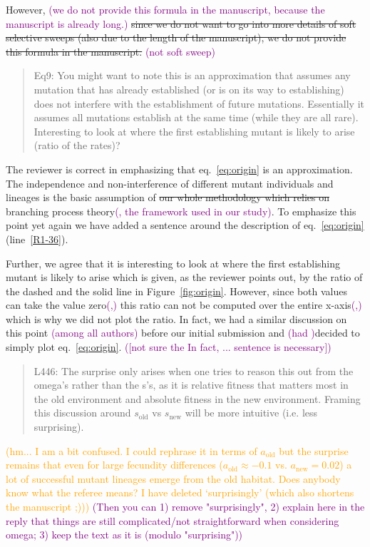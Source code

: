\documentclass[11pt]{article}
\newenvironment{referee}{\vspace{0.cm} \sffamily \color{colreferee} \begin{quotation} }{\end{quotation} \vspace{0.cm}}
\newcommand{\lmarginpar}[1]{\reversemarginpar\marginpar{\textcolor{colreferee}{\textbf{\textsf{[#1]}}}}}
\newcommand{\addnb}[1]{\refstepcounter{numcom}\lmarginpar{\arabic{numcom}}\label{#1}}
\newcommand{\florence}[1]{\textcolor{purple}{(#1)}}
\newcommand{\pete}[1]{\textcolor{orange}{(#1)}}
\newcounter{numcom}
\begin{document}
However, \florence{we do not provide this formula in the manuscript, because the manuscript is already long.}\st{ since we do not want to go into more details of soft selective sweeps (also due to the length of the manuscript), we do not provide this formula in the manuscript.} \florence{not soft sweep}

\begin{referee}
Eq9:\addnb{R1_36} You might want to note this is an approximation that assumes any mutation that has already established (or is on its way to establishing) does not interfere with the establishment of future mutations. Essentially it assumes all mutations establish at the same time (while they are all rare). Interesting to look at where the first establishing mutant is likely to arise (ratio of the rates)?
\end{referee}

The reviewer is correct in emphasizing that eq.~\eqref{eq:origin} is an approximation. The independence and non-interference of different mutant individuals and lineages is the basic assumption of \st{our whole methodology which relies on }branching process theory\florence{, the framework used in our study}. To emphasize this point yet again we have added a sentence around the description of eq.~\eqref{eq:origin} (line~\ref{R1-36}). 

Further, we agree that it is interesting to look at where the first establishing mutant is likely to arise which is given, as the reviewer points out, by the ratio of the dashed and the solid line in Figure~\ref{fig:origin}. However, since both values can take the value zero\florence{,} this ratio can not be computed over the entire x-axis\florence{,} which is why we did not plot the ratio. In fact, we had a similar discussion on this point \florence{among all authors} before our initial submission and \florence{had }decided to simply plot eq.~\eqref{eq:origin}. \florence{[not sure the In fact, ... sentence is necessary]}

\begin{referee}
L446:\addnb{R1_37} The surprise only arises when one tries to reason this out from the omega's rather than the s's, as it is relative fitness that matters most in the old environment and absolute fitness in the new environment. Framing this discussion around $s_{\text{old}}$ vs $s_{\text{new}}$ will be more intuitive (i.e. less surprising).
\end{referee}

\pete{hm... I am a bit confused. I could rephrase it in terms of $a_{\text{old}}$ but the surprise remains that even for large fecundity differences ($a_{\text{old}}\approx -0.1$ vs. $a_{\text{new}}=0.02$) a lot of successful mutant lineages emerge from the old habitat. Does anybody know what the referee means? I have deleted `surprisingly' (which also shortens the manuscript ;))} \florence{Then you can 1) remove "surprisingly", 2) explain here in the reply that things are still complicated/not straightforward when considering omega; 3) keep the text as it is (modulo "surprising")}
\end{document}
